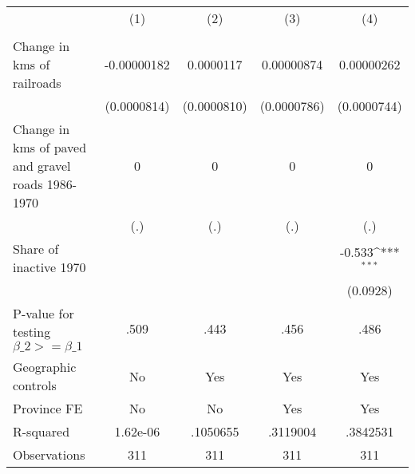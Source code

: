 {
\def\sym#1{\ifmmode^{#1}\else\(^{#1}\)\fi}
\begin{tabular}{l*{4}{c}}
\hline\hline
                &\multicolumn{1}{c}{(1)}&\multicolumn{1}{c}{(2)}&\multicolumn{1}{c}{(3)}&\multicolumn{1}{c}{(4)}\\
                &\multicolumn{1}{c}{}&\multicolumn{1}{c}{}&\multicolumn{1}{c}{}&\multicolumn{1}{c}{}\\
\hline
Change in kms of railroads&-0.00000182         &0.0000117         &0.00000874         &0.00000262         \\
                &(0.0000814)         &(0.0000810)         &(0.0000786)         &(0.0000744)         \\
[1em]
Change in kms of paved and gravel roads 1986-1970&        0         &        0         &        0         &        0         \\
                &      (.)         &      (.)         &      (.)         &      (.)         \\
[1em]
Share of inactive 1970&                  &                  &                  &   -0.533\sym{***}\\
                &                  &                  &                  & (0.0928)         \\
\hline
P-value for testing $\beta\_{2} >= \beta\_{1}$&     .509         &     .443         &     .456         &     .486         \\
Geographic controls&       No         &      Yes         &      Yes         &      Yes         \\
Province FE     &       No         &       No         &      Yes         &      Yes         \\
R-squared       & 1.62e-06         & .1050655         & .3119004         & .3842531         \\
Observations    &      311         &      311         &      311         &      311         \\
\hline\hline
\end{tabular}
}
